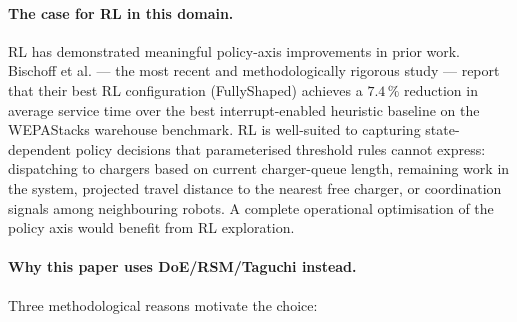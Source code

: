 \documentclass[conference]{IEEEtran}
\begin{document}
\paragraph{The case for RL in this domain.}
RL has demonstrated meaningful policy-axis improvements in prior work. Bischoff et al. \cite{bischoff2025} --- the most recent and methodologically rigorous study --- report that their best RL configuration (FullyShaped) achieves a $7.4\,\%$ reduction in average service time over the best interrupt-enabled heuristic baseline on the WEPAStacks warehouse benchmark. RL is well-suited to capturing state-dependent policy decisions that parameterised threshold rules cannot express: dispatching to chargers based on current charger-queue length, remaining work in the system, projected travel distance to the nearest free charger, or coordination signals among neighbouring robots. A complete operational optimisation of the policy axis would benefit from RL exploration.

\paragraph{Why this paper uses DoE/RSM/Taguchi instead.}
Three methodological reasons motivate the choice:
\end{document}
